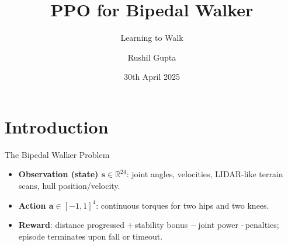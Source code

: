 \documentclass[10pt,aspectratio=169]{beamer}
\title{PPO for Bipedal Walker}
\subtitle{Learning to Walk}
\author{Rushil Gupta}
\date{30th April 2025}
\begin{document}
\begin{frame}[plain]
  \titlepage
\end{frame}



\section{Introduction}

\begin{frame}{The Bipedal Walker Problem}
\begin{itemize}
  \item \textbf{Observation (state) $\bm{s}\in\mathbb{R}^{24}$}: joint angles, velocities, LIDAR-like terrain scans, hull position/velocity.
  \item \textbf{Action $\bm{a}\in[-1,1]^4$}: continuous torques for two hips and two knees.
  \item \textbf{Reward}: distance progressed $+\,$stability bonus $-\,$joint power -\,penalties; episode terminates upon fall or timeout.
\end{itemize}
\end{frame}
\end{document}
